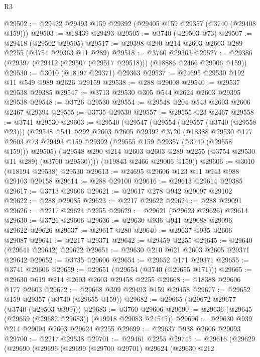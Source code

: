 \begin{lexlean}{R3}
\begin{coremodule}
@29502 := @29422 @29493 @159 @29392 (@29405 @159 @29357 (@3740 (@29408 @159)))
@29503 := @18439 @29493
@29505 := @3740 (@29503 @73)
@29507 := @29418 (@29502 @29505)
@29517 := @29398 @290 @214 @2603 @2603 @289 @2255 (@3754 @29363 @11 @289)
@29518 := @3760 @29363
@29527 := @29386 (@29397 (@29412 (@29507 (@29517 @29518))) (@18886 @2466 @29006 @159))
@29530 := @3010 (@18197 @29371) @29363
@29537 := @24695 @29530 @192 @11 @549 @989 @2626 @29159
@29538 := @288 @29008
@29540 := @29537 @29538 @29385
@29547 := @3713 @29530 @305 @544 @2624 @2603 @29395 @29538
@29548 := @3726 @29530
@29554 := @29548 @204 @543 @2603 @2606 @2467 @29394
@29555 := @3735 @29530
@29557 := @29555 @23 @2467
@29558 := @3741 @29530
@29603 := @29540
    (@29547
      (@29554
        (@29557 (@3740 (@29558 @23)))
        (@29548
          @541
          @292
          @2603
          @2605
          @29392
          @3720
          (@18388
            @29530
            @177
            @2603
            @73
            @29493
            @159
            @29392
            (@29555 @159 @29357 (@3740 (@29558 @159)))
            @29505)
          (@29548 @290 @214 @2603 @2603 @289 @2255 (@3754 @29530 @11 @289) (@3760 @29530))))
      (@19843 @2466 @29006 @159))
@29606 := @3010 (@18194 @29538) @29530
@29613 := @24695 @29606 @123 @11 @943 @988 @29103 @29158
@29614 := @288 @29100
@29616 := @29613 @29614 @29385
@29617 := @3713 @29606
@29621 := @29617 @278 @942 @29097 @29102
@29622 := @288 @29085
@29623 := @2217 @29622
@29624 := @288 @29091
@29626 := @2217 @29624 @2255
@29629 := @29621 (@29623 @29626) @29614
@29630 := @3726 @29606
@29636 := @29630 @936 @941 @29088 @29096 @29622 @29626
@29637 := @29617 @280
@29640 := @29637 @935 @2606 @29087
@29641 := @2217 @29371
@29642 := @29459 @2255
@29645 := @29640 (@29641 @29642) @29622
@29651 := @29630 @210 @621 @2603 @2605 @29371 @29642
@29652 := @3735 @29606
@29654 := @29652 @171 @29371
@29655 := @3741 @29606
@29659 := @29651 (@29654 (@3740 (@29655 @171)))
@29665 := @29630 @619 @214 @2603 @2603 @29458 @2255
@29668 := @18388 @29606 @177 @2603
@29672 := @29668 @399 @29493 @159 @29458
@29677 := @29652 @159 @29357 (@3740 (@29655 @159))
@29682 := @29665 (@29672 @29677 (@3740 (@29503 @399)))
@29683 := @3760 @29606
@29690 := @29636 (@29645 (@29659 (@29682 @29683)) (@19918 @29083 @24545))
@29696 := @29630 @939 @214 @29094 @2603 @29624 @2255
@29699 := @29637 @938 @2606 @29093
@29700 := @2217 @29538
@29701 := @29461 @2255
@29745 := @29616
    (@29629
      (@29690
        (@29696
          (@29699
            (@29700 @29701)
            @29624
            (@29630
              @212

\end{coremodule}
\end{lexlean}
